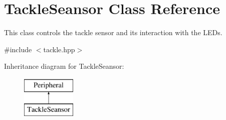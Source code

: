 \hypertarget{class_tackle_seansor}{}\section{Tackle\+Seansor Class Reference}
\label{class_tackle_seansor}


This class controls the tackle sensor and its interaction with the L\+E\+Ds.  




{\ttfamily \#include $<$tackle.\+hpp$>$}

Inheritance diagram for Tackle\+Seansor\+:\begin{figure}[H]
\begin{center}
\leavevmode
\includegraphics[height=2.000000cm]{class_tackle_seansor}
\end{center}
\end{figure}

